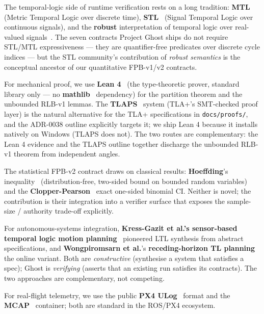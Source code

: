 \documentclass[acmsmall,nonacm=true,review=false]{acmart}
\theoremstyle{plain}
\begin{document}
The temporal-logic side of runtime verification rests on a long
tradition: \textbf{MTL}~\cite{koymans1990specifying} (Metric
Temporal Logic over discrete time), \textbf{STL}~\cite{maler2004monitoring}
(Signal Temporal Logic over continuous signals), and the
\textbf{robust} interpretation of temporal logic over real-valued
signals~\cite{donze2013breach}. The seven contracts Project Ghost
ships do not require STL/MTL expressiveness --- they are
quantifier-free predicates over discrete cycle indices --- but
the STL community's contribution of \emph{robust semantics} is
the conceptual ancestor of our quantitative FPB-v1/v2 contracts.

For mechanical proof, we use \textbf{Lean 4}~\cite{moura2021lean4}
(the type-theoretic prover, standard library only --- no
\textbf{mathlib}~\cite{mathlib2024lean} dependency) for the
partition theorem and the unbounded RLB-v1 lemmas. The
\textbf{TLAPS}~\cite{cousineau2012tlaps} system (TLA+'s SMT-checked
proof layer) is the natural alternative for the TLA+
specifications in \texttt{docs/proofs/}, and the ADR-0038 outline
explicitly targets it; we ship Lean 4 because it installs natively
on Windows (TLAPS does not). The two routes are complementary:
the Lean 4 evidence and the TLAPS outline together discharge the
unbounded RLB-v1 theorem from independent angles.

The statistical FPB-v2 contract draws on classical results:
\textbf{Hoeffding}'s
inequality~\cite{hoeffding1963inequalities} (distribution-free,
two-sided bound on bounded random variables) and the
\textbf{Clopper-Pearson}~\cite{clopper1934binomial} exact
one-sided binomial CI. Neither is novel; the contribution is
their integration into a verifier surface that exposes the
sample-size / authority trade-off explicitly.

For autonomous-systems integration, \textbf{Kress-Gazit et al.'s
sensor-based temporal logic motion
planning}~\cite{kress2007shielding} pioneered LTL synthesis from
abstract specifications, and \textbf{Wongpiromsarn et al.}'s
\textbf{receding-horizon TL
planning}~\cite{wongpiromsarn2012receding} the online variant.
Both are \emph{constructive} (synthesise a system that satisfies
a spec); Ghost is \emph{verifying} (asserts that an existing run
satisfies its contracts). The two approaches are complementary,
not competing.

For real-flight telemetry, we use the public
\textbf{PX4 ULog}~\cite{px42024ulog} format and the
\textbf{MCAP}~\cite{foxglove2022mcap} container; both are
standard in the ROS/PX4 ecosystem.
\end{document}
